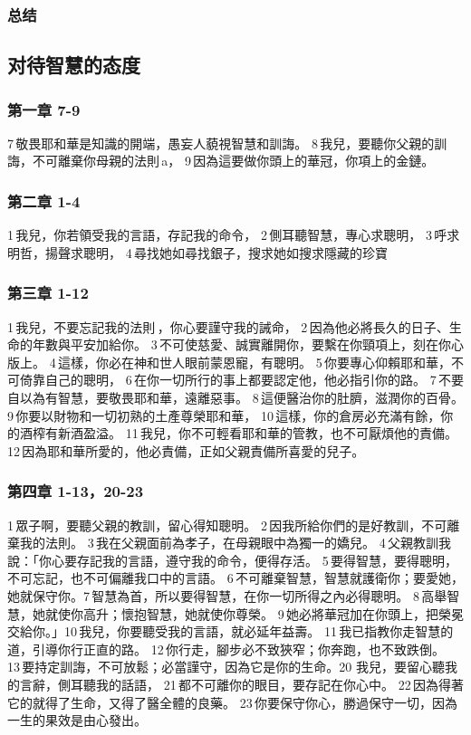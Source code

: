 \subsubsection{总结}  




\subsection{对待智慧的态度}
\subsubsection{第一章 7-9}
7 敬畏耶和華是知識的開端，愚妄人藐視智慧和訓誨。 8 我兒，要聽你父親的訓誨，不可離棄你母親的法則 a， 9 因為這要做你頭上的華冠，你項上的金鏈。
\subsubsection{第二章 1-4}
1 我兒，你若領受我的言語，存記我的命令， 2 側耳聽智慧，專心求聰明， 3 呼求明哲，揚聲求聰明， 4 尋找她如尋找銀子，搜求她如搜求隱藏的珍寶 
\subsubsection{第三章 1-12} 
1 我兒，不要忘記我的法則 ，你心要謹守我的誡命， 2 因為他必將長久的日子、生命的年數與平安加給你。 3 不可使慈愛、誠實離開你，要繫在你頸項上，刻在你心版上。 4 這樣，你必在神和世人眼前蒙恩寵，有聰明。 5 你要專心仰賴耶和華，不可倚靠自己的聰明， 6 在你一切所行的事上都要認定他，他必指引你的路。 7 不要自以為有智慧，要敬畏耶和華，遠離惡事。 8 這便醫治你的肚臍，滋潤你的百骨。 9 你要以財物和一切初熟的土產尊榮耶和華， 10 這樣，你的倉房必充滿有餘，你的酒榨有新酒盈溢。 11 我兒，你不可輕看耶和華的管教，也不可厭煩他的責備。 12 因為耶和華所愛的，他必責備，正如父親責備所喜愛的兒子。
\subsubsection{第四章 1-13，20-23} 
1 眾子啊，要聽父親的教訓，留心得知聰明。 2 因我所給你們的是好教訓，不可離棄我的法則。 3 我在父親面前為孝子，在母親眼中為獨一的嬌兒。 4 父親教訓我說：「你心要存記我的言語，遵守我的命令，便得存活。 5 要得智慧，要得聰明，不可忘記，也不可偏離我口中的言語。 6 不可離棄智慧，智慧就護衛你；要愛她，她就保守你。7 智慧為首，所以要得智慧，在你一切所得之內必得聰明。 8 高舉智慧，她就使你高升；懷抱智慧，她就使你尊榮。 9 她必將華冠加在你頭上，把榮冕交給你。」10 我兒，你要聽受我的言語，就必延年益壽。 11 我已指教你走智慧的道，引導你行正直的路。 12 你行走，腳步必不致狹窄；你奔跑，也不致跌倒。 13 要持定訓誨，不可放鬆；必當謹守，因為它是你的生命。20 我兒，要留心聽我的言辭，側耳聽我的話語， 21 都不可離你的眼目，要存記在你心中。 22 因為得著它的就得了生命，又得了醫全體的良藥。 23 你要保守你心，勝過保守一切，因為一生的果效是由心發出。
